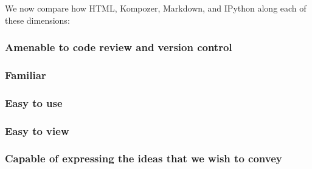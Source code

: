\documentclass[]{article}
\begin{document}
We now compare how HTML, Kompozer, Markdown, and IPython along each of these dimensions:

	\subsubsection{Amenable to code review and version control}
	
		
	
	\subsubsection{Familiar}
	
	\subsubsection{Easy to use}
	
	\subsubsection{Easy to view}
	
	\subsubsection{Capable of expressing the ideas that we wish to convey}
\end{document}
